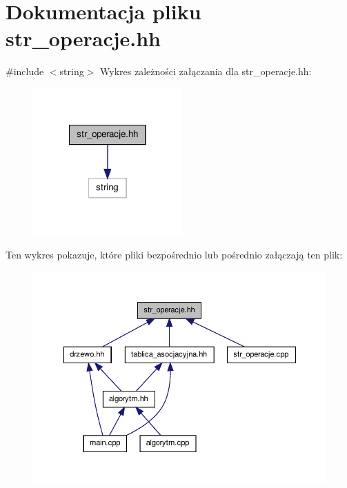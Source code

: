 \hypertarget{str__operacje_8hh}{\section{\-Dokumentacja pliku str\-\_\-operacje.\-hh}
\label{str__operacje_8hh}
}
{\ttfamily \#include $<$string$>$}\*
\-Wykres zależności załączania dla str\-\_\-operacje.\-hh\-:\nopagebreak
\begin{figure}[H]
\begin{center}
\leavevmode
\includegraphics[width=162pt]{str__operacje_8hh__incl}
\end{center}
\end{figure}
\-Ten wykres pokazuje, które pliki bezpośrednio lub pośrednio załączają ten plik\-:\nopagebreak
\begin{figure}[H]
\begin{center}
\leavevmode
\includegraphics[width=350pt]{str__operacje_8hh__dep__incl}
\end{center}
\end{figure}

